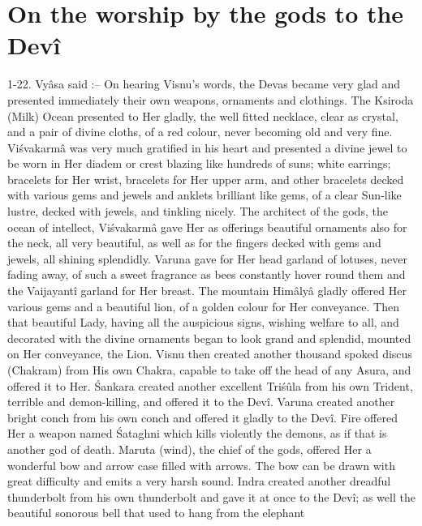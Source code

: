 ﻿\chapter{On the worship by the gods to the Dev\^i}

1-22. Vy\^asa said :-- On hearing Visnu's words, the Devas became very glad and presented immediately their own weapons, ornaments and clothings. The Ksiroda (Milk) Ocean presented to Her gladly, the well fitted necklace, clear as crystal, and a pair of divine cloths, of a red colour, never becoming old and very fine. Vi\'svakarm\^a was very much gratified in his heart and presented a divine jewel to be worn in Her diadem or crest blazing like hundreds of suns; white earrings; bracelets for Her wrist, bracelets for Her upper arm, and other bracelets decked with various gems and jewels and anklets brilliant like gems, of a clear Sun-like lustre, decked with jewels, and tinkling nicely. The architect of the gods, the ocean of intellect, Vi\'svakarm\^a gave Her as offerings beautiful ornaments also for the neck, all very beautiful, as well as for the fingers decked with gems and jewels, all shining splendidly. Varuna gave for Her head garland of lotuses, never fading away, of such a sweet fragrance as bees constantly hover round them and the Vaijayant\^i garland for Her breast. The mountain Him\^aly\^a gladly offered Her various gems and a beautiful lion, of a golden colour for Her conveyance. Then that beautiful Lady, having all the auspicious signs, wishing welfare to all, and decorated with the divine ornaments began to look grand and splendid, mounted on Her conveyance, the Lion. Visnu then created another thousand spoked discus (Chakram) from His own Chakra, capable to take off the head of any Asura, and offered it to Her. \'Sankara created another excellent Tri\'s\^ula from his own Trident, terrible and demon-killing, and offered it to the Dev\^i. Varuna created another bright conch from his own conch and offered it gladly to the Dev\^i. Fire offered Her a weapon named \'Sataghni which kills violently the demons, as if that is another god of death. Maruta (wind), the chief of the gods, offered Her a wonderful bow and arrow case filled with arrows. The bow can be drawn with great difficulty and emits a very harsh sound. Indra created another dreadful thunderbolt from his own thunderbolt and gave it at once to the Dev\^i; as well the beautiful sonorous bell that used to hang from the elephant


